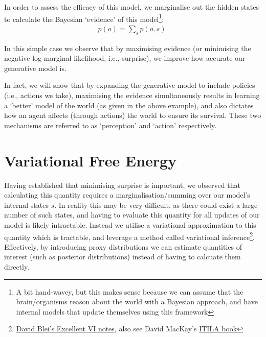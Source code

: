 \documentclass{article}
\begin{document}
In order to assess the efficacy of this model, we marginalise out the hidden states to calculate the Bayesian `evidence' of this model\footnote{A bit hand-wavey, but this makes sense because we can assume that the brain/organisms reason about the world with a Bayesian approach, and have internal models that update themselves using this framework}:
\begin{align}
    p(o) = \sum_s p(o,s).
\end{align}

In this simple case we observe that by maximising evidence (or minimising the negative log marginal likelihood, i.e., surprise), we improve how accurate our generative model is.

In fact, we will show that by expanding the generative model to include policies (i.e., actions we take), maximising the evidence simultaneously results in learning a `better' model of the world (as given in the above example), and also dictates how an agent affects (through actions) the world to ensure its survival. These two mechanisms are referred to as `perception' and `action' respectively.

\section{Variational Free Energy}

Having established that minimising surprise is important, we observed that calculating this quantity requires a marginalisation/summing over our model's internal states $s$. In reality this may be very difficult, as there could exist a large number of such states, and having to evaluate this quantity for all updates of our model is likely intractable. Instead we utilise a variational approximation to this quantity which is tractable, and leverage a method called variational inference\footnote{\href{https://www.cs.princeton.edu/courses/archive/fall11/cos597C/lectures/variational-inference-i.pdf}{David Blei's Excellent VI notes}, also see David MacKay's \href{https://www.inference.org.uk/itprnn/book.pdf}{ITILA book}}. Effectively, by introducing proxy distributions we can estimate quantities of interest (such as posterior distributions) instead of having to calcuate them directly. 
\end{document}
